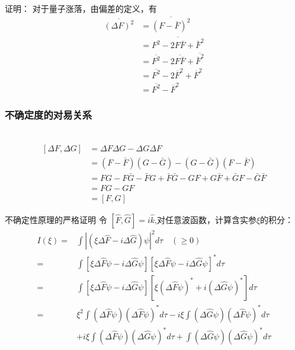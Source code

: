 \begin{frame} 
    \frametitle{}
    \alert{证明：} 对于量子涨落，由偏差的定义，有
    \begin{equation*}
        \begin{split} 
        \overline{(\Delta F)^2}&= \overline{(F-\bar{F})^2}\\
        &=\overline{F^2-2F\bar{F}+\bar{F}^2 }\\
        &=\overline{F^2} -2\overline{F\bar{F}} +\overline{\bar{F}^2 }\\
        &=\overline{F^2} -2\overline{F}^2 +\overline{F}^2\\
        &= \overline{F^2} - \overline{F}^2
        \end{split}  
    \end{equation*} 
\end{frame} 

\begin{frame} 
    \frametitle{不确定度的对易关系}
    \证~
    \begin{equation*}
        \begin{split} 
        [\Delta F, \Delta G]&= \Delta F \Delta G - \Delta G \Delta F \\
        &=(F-\bar{F}) (G-\bar{G})- (G-\bar{G}) (F-\bar{F}) \\
        &=FG -F\bar{G}-\bar{F}G + \bar{F} \bar{G} -GF + G \bar{F} + \bar{G} F -\bar{G} \bar{F}   \\
        &=FG-GF \\
        &=[F, G]
        \end{split}  
    \end{equation*} 
\end{frame} 

\begin{frame} {不确定性原理的严格证明}
    令 $[\hat{F}, \hat{G}]= i\hat{k}$,对任意波函数，计算含实参$\xi$的积分：
    $$
    \begin{aligned}
    I(\xi)= &\int|(\xi\Delta \hat{F}-i \Delta \hat{G}) \psi|^{2} d \tau \quad (\geq 0) \\
    =&\int[\xi \Delta \hat{F} \psi-i \Delta \hat{G} \psi][\xi \Delta \hat{F} \psi-i \Delta \hat{G} \psi]^{*} d \tau \\
    =&\int[\xi \Delta \hat{F} \psi-i \Delta \hat{G} \psi] [\xi(\Delta \hat{F} \psi)^{*}+i(\Delta \hat{G} \psi)^{*}] d \tau \\
    =& \xi^{2} \int(\Delta \hat{F} \psi)(\Delta \hat{F} \psi)^* d \tau-i \xi \int(\Delta \hat{G} \psi)(\Delta \hat{F} \psi)^* d \tau \\
        &+i \xi \int(\Delta \hat{F} \psi)(\Delta \hat{G} \psi)^* d \tau+\int(\Delta \hat{G} \psi)(\Delta \hat{G} \psi)^* d \tau \\
    \end{aligned}
    $$
\end{frame} 


